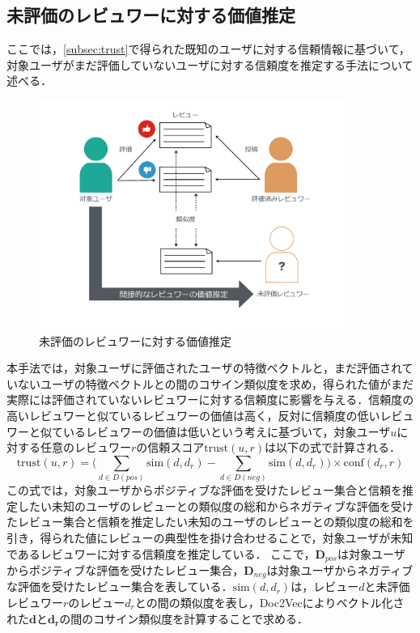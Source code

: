 \documentclass[a4paper,11pt,oneside,openany]{jsbook}
\begin{document}
	\subsection{未評価のレビュワーに対する価値推定}
\label{subsubsec:weight}
ここでは，\ref{subsec:trust}で得られた既知のユーザに対する信頼情報に基づいて，対象ユーザがまだ評価していないユーザに対する信頼度を推定する手法について述べる．
\begin{figure}[tb]
	\begin{center} %
		\includegraphics[width = 100mm]{figures/trust2.pdf} %
	\end{center}
	\caption{未評価のレビュワーに対する価値推定} %
	\label{fig:trust2} %
\end{figure}
本手法では，対象ユーザに評価されたユーザの特徴ベクトルと，まだ評価されていないユーザの特徴ベクトルとの間のコサイン類似度を求め，得られた値がまだ実際には評価されていないレビュワーに対する信頼度に影響を与える．信頼度の高いレビュワーと似ているレビュワーの価値は高く，反対に信頼度の低いレビュワーと似ているレビュワーの価値は低いという考えに基づいて，対象ユーザ$u$に対する任意のレビュワー$r$の信頼スコア$\mathrm{trust}(u, r)$は以下の式で計算される．
\begin{equation}
\mathrm{trust}(u ,r) = \biggl(\sum_{d\in{D(pos)}}\mathrm{sim}(d, d_{r})-\sum_{d\in{D(neg)}}\mathrm{sim}(d, d_{r})\biggr)\times\mathrm{conf}(d_{r}, r)
\end{equation}
この式では，対象ユーザからポジティブな評価を受けたレビュー集合と信頼を推定したい未知のユーザのレビューとの類似度の総和からネガティブな評価を受けたレビュー集合と信頼を推定したい未知のユーザのレビューとの類似度の総和を引き，得られた値にレビューの典型性を掛け合わせることで，対象ユーザが未知であるレビュワーに対する信頼度を推定している．
ここで，$\mathbf{D}_{pos}$は対象ユーザからポジティブな評価を受けたレビュー集合，$\mathbf{D}_{neg}$は対象ユーザからネガティブな評価を受けたレビュー集合を表している．$\mathrm{sim}(d, d_{r})$は，レビュー$d$と未評価レビュワー$r$のレビュー$d_r$との間の類似度を表し，Doc2Vecによりベクトル化された$\mathbf{d}$と$\mathbf{d_r}$の間のコサイン類似度を計算することで求める．
\end{document}
